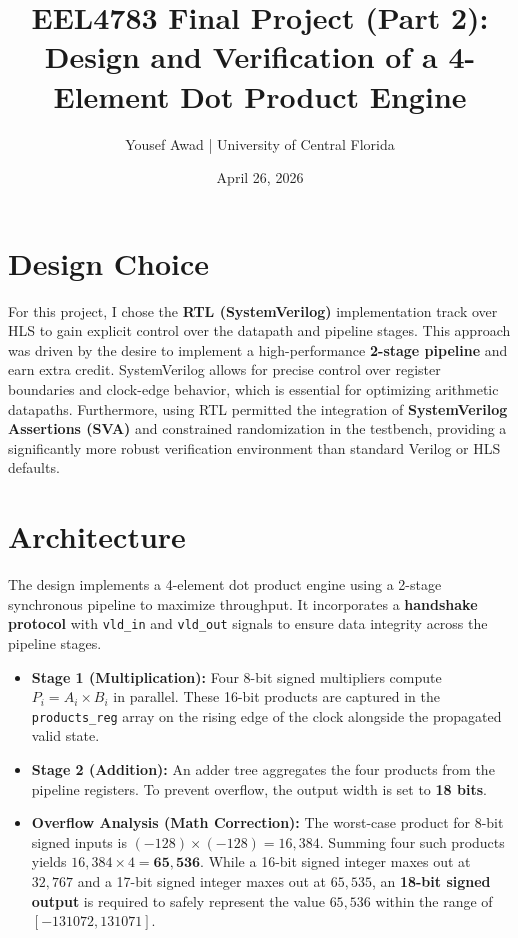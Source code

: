 \documentclass[11pt,letterpaper]{article}
\title{\textbf{EEL4783 Final Project (Part 2):\\Design and Verification of a 4-Element Dot Product Engine}}
\author{Yousef Awad | University of Central Florida}
\date{April 26, 2026}
\begin{document}
\maketitle
\thispagestyle{fancy}

\section{Design Choice}
For this project, I chose the \textbf{RTL (SystemVerilog)} implementation track over HLS to gain explicit control over the datapath and pipeline stages. This approach was driven by the desire to implement a high-performance \textbf{2-stage pipeline} and earn extra credit. SystemVerilog allows for precise control over register boundaries and clock-edge behavior, which is essential for optimizing arithmetic datapaths. Furthermore, using RTL permitted the integration of \textbf{SystemVerilog Assertions (SVA)} and constrained randomization in the testbench, providing a significantly more robust verification environment than standard Verilog or HLS defaults.

\section{Architecture}
The design implements a 4-element dot product engine using a 2-stage synchronous pipeline to maximize throughput. It incorporates a \textbf{handshake protocol} with \texttt{vld\_in} and \texttt{vld\_out} signals to ensure data integrity across the pipeline stages.
\begin{itemize}
    \item \textbf{Stage 1 (Multiplication):} Four 8-bit signed multipliers compute $P_i = A_i \times B_i$ in parallel. These 16-bit products are captured in the \texttt{products\_reg} array on the rising edge of the clock alongside the propagated valid state.
    \item \textbf{Stage 2 (Addition):} An adder tree aggregates the four products from the pipeline registers. To prevent overflow, the output width is set to \textbf{18 bits}.
    \item \textbf{Overflow Analysis (Math Correction):} The worst-case product for 8-bit signed inputs is $(-128) \times (-128) = 16,384$. Summing four such products yields $16,384 \times 4 = \mathbf{65,536}$. While a 16-bit signed integer maxes out at $32,767$ and a 17-bit signed integer maxes out at $65,535$, an \textbf{18-bit signed output} is required to safely represent the value $65,536$ within the range of $[-131072, 131071]$.
\end{itemize}
\end{document}
